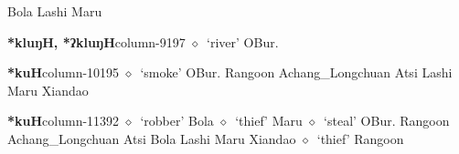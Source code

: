          Bola 
\hspace{1ex}
         Lashi 
\hspace{1ex}
         Maru 
  \item {\footnotesize \textbf{*kluŋH, *ʔkluŋH}}{\tiny column-9197}
         $\diamond$~`river'
         OBur. 
  \item {\footnotesize \textbf{*kuH}}{\tiny column-10195}
         $\diamond$~`smoke'
         OBur. 
\hspace{1ex}
         Rangoon 
\hspace{1ex}
         Achang\_Longchuan 
\hspace{1ex}
         Atsi 
\hspace{1ex}
         Lashi 
\hspace{1ex}
         Maru 
\hspace{1ex}
         Xiandao 
  \item {\footnotesize \textbf{*kuH}}{\tiny column-11392}
         $\diamond$~`robber'
         Bola 
\hspace{1ex}
         $\diamond$~`thief'
         Maru 
\hspace{1ex}
         $\diamond$~`steal'
         OBur. 
\hspace{1ex}
         Rangoon 
\hspace{1ex}
         Achang\_Longchuan 
\hspace{1ex}
         Atsi 
\hspace{1ex}
         Bola 
\hspace{1ex}
         Lashi 
\hspace{1ex}
         Maru 
\hspace{1ex}
         Xiandao 
\hspace{1ex}
         $\diamond$~`thief'
         Rangoon 
\hspace{1ex}
